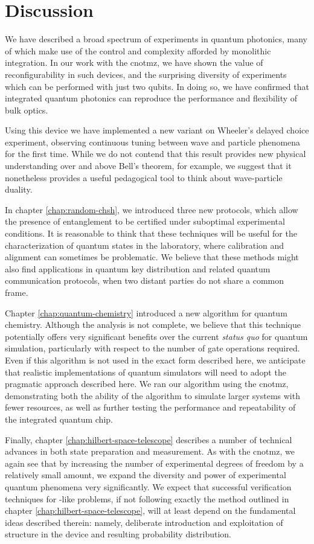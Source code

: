 \chapter{Discussion}
\label{chap:discussion}

We have described a broad spectrum of experiments in quantum photonics, many of which make use of the control and complexity afforded by monolithic integration. In our work with the \gls{cnotmz}, we have shown the value of reconfigurability in such devices, and the surprising diversity of experiments which can be performed with just two qubits. In doing so, we have confirmed that integrated quantum photonics can reproduce the performance and flexibility of bulk optics. 

Using this device we have implemented a new variant on Wheeler's delayed choice experiment, observing continuous tuning between wave and particle phenomena for the first time. While we do not contend that this result provides new physical understanding over and above Bell's theorem, for example, we suggest that it nonetheless provides a useful pedagogical tool to think about wave-particle duality.

In chapter \ref{chap:random-chsh}, we introduced three new protocols, which allow the presence of entanglement to be certified under suboptimal experimental conditions. It is reasonable to think that these techniques will be useful for the characterization of quantum states in the laboratory, where calibration and alignment can sometimes be problematic. We believe that these methods might also find applications in quantum key distribution and related quantum communication protocols, when two distant parties do not share a common frame.

Chapter \ref{chap:quantum-chemistry} introduced a new algorithm for quantum chemistry. Although the analysis is not complete, we believe that this technique potentially offers very significant benefits over the current \emph{status quo} for quantum simulation, particularly with respect to the number of gate operations required. Even if this algorithm is not used in the exact form described here, we anticipate that realistic implementations of quantum simulators will need to adopt the pragmatic approach described here. We ran our algorithm using the \gls{cnotmz}, demonstrating both the ability of the algorithm to simulate larger systems with fewer resources, as well as further testing the performance and repeatability of the integrated quantum chip.

Finally, chapter \ref{chap:hilbert-space-telescope} describes a number of technical advances in both state preparation and measurement. As with the \gls{cnotmz}, we again see that by increasing the number of experimental degrees of freedom by a relatively small amount, we expand the diversity and power of experimental quantum phenomena very significantly. We expect that successful verification techniques for \bosonsampling-like problems, if not following exactly the method outlined in chapter \ref{chap:hilbert-space-telescope}, will at least depend on the fundamental ideas described therein: namely, deliberate introduction and exploitation of structure in the device and resulting probability distribution.



